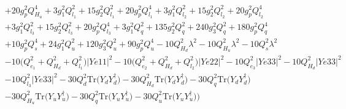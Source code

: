 {\begin{align}
 &+20 g_{p}^{2} Q_{H_u}^{4} +3 g_{1}^{2} Q_{l_1}^{2} +15 g_{2}^{2} Q_{l_1}^{2} +20 g_{p}^{2} Q_{l_1}^{4} +3 g_{1}^{2} Q_{l_2}^{2} +15 g_{2}^{2} Q_{l_2}^{2} +20 g_{p}^{2} Q_{l_2}^{4} \nonumber \\ 
 &+3 g_{1}^{2} Q_{l_3}^{2} +15 g_{2}^{2} Q_{l_3}^{2} +20 g_{p}^{2} Q_{l_3}^{4} +3 g_{1}^{2} Q_{q}^{2} +135 g_{2}^{2} Q_{q}^{2} +240 g_{3}^{2} Q_{q}^{2} +180 g_{p}^{2} Q_{q}^{4} \nonumber \\ 
 &+10 g_{p}^{2} Q_{s}^{4} +24 g_{1}^{2} Q_{u}^{2} +120 g_{3}^{2} Q_{u}^{2} +90 g_{p}^{2} Q_{u}^{4} -10 Q_{H_d}^{2} \lambda^{2} -10 Q_{H_u}^{2} \lambda^{2} -10 Q_{s}^{2} \lambda^{2} \nonumber \\ 
 &-10 \Big(Q_{e_{1}}^{2} + Q_{H_d}^{2} + Q_{l_1}^{2}\Big)|Ye11|^2 -10 \Big(Q_{e_{2}}^{2} + Q_{H_d}^{2} + Q_{l_2}^{2}\Big)|Ye22|^2 -10 Q_{e_3}^{2} |Ye33|^2 -10 Q_{H_d}^{2} |Ye33|^2 \nonumber \\ 
 &-10 Q_{l_3}^{2} |Ye33|^2 -30 Q_{d}^{2} \mbox{Tr}\Big({Y_d  Y_{d}^{\dagger}}\Big) -30 Q_{H_d}^{2} \mbox{Tr}\Big({Y_d  Y_{d}^{\dagger}}\Big) -30 Q_{q}^{2} \mbox{Tr}\Big({Y_d  Y_{d}^{\dagger}}\Big) \nonumber \\ 
 &-30 Q_{H_u}^{2} \mbox{Tr}\Big({Y_u  Y_{u}^{\dagger}}\Big) -30 Q_{q}^{2} \mbox{Tr}\Big({Y_u  Y_{u}^{\dagger}}\Big) -30 Q_{u}^{2} \mbox{Tr}\Big({Y_u  Y_{u}^{\dagger}}\Big) \Big)
\end{align}} 
